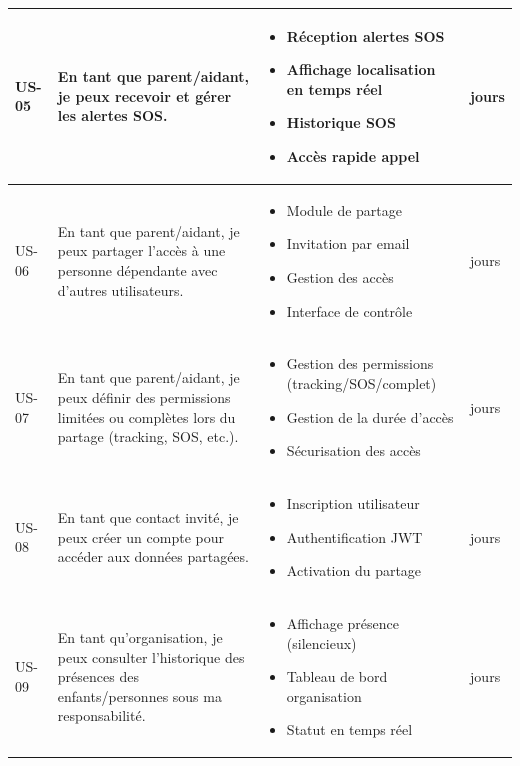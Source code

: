 \begin{longtable}{|>{\centering\arraybackslash}p{}|>{\raggedright\arraybackslash}p{}|>{\raggedright\arraybackslash}p{}|>{\centering\arraybackslash}p{}|}
US-05 & En tant que parent/aidant, je peux recevoir et gérer les alertes SOS.
& \begin{itemize}[leftmargin=*, nosep]
\item Réception alertes SOS
\item Affichage localisation en temps réel
\item Historique SOS
\item Accès rapide appel
\end{itemize}
& 3 jours \\ \hline

US-06 & En tant que parent/aidant, je peux partager l’accès à une personne dépendante avec d’autres utilisateurs.
& \begin{itemize}[leftmargin=*, nosep]
\item Module de partage
\item Invitation par email
\item Gestion des accès
\item Interface de contrôle
\end{itemize}
& 3 jours \\ \hline

US-07 & En tant que parent/aidant, je peux définir des permissions limitées ou complètes lors du partage (tracking, SOS, etc.).
& \begin{itemize}[leftmargin=*, nosep]
\item Gestion des permissions (tracking/SOS/complet)
\item Gestion de la durée d’accès
\item Sécurisation des accès
\end{itemize}
& 3 jours \\ \hline

US-08 & En tant que contact invité, je peux créer un compte pour accéder aux données partagées.
& \begin{itemize}[leftmargin=*, nosep]
\item Inscription utilisateur
\item Authentification JWT
\item Activation du partage
\end{itemize}
& 2 jours \\ \hline

US-09 & En tant qu’organisation, je peux consulter l’historique des présences des enfants/personnes sous ma responsabilité.
& \begin{itemize}[leftmargin=*, nosep]
\item Affichage présence (silencieux)
\item Tableau de bord organisation
\item Statut en temps réel
\end{itemize}
& 3 jours \\ \hline


\end{longtable}
